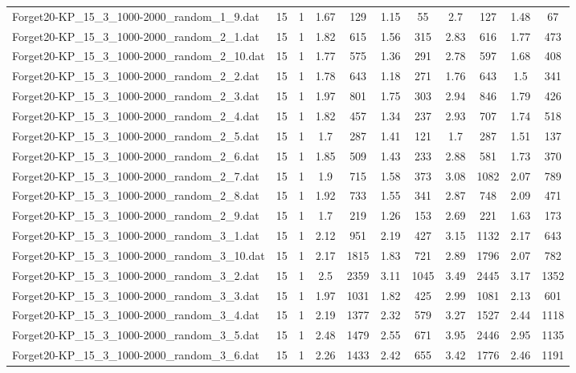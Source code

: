 \begin{table}[!ht]
\begin{tabular}{lcccccccccc}
Forget20-KP\_15\_3\_1000-2000\_random\_1\_9.dat & 15 & 1 & 1.67 & 129 & 1.15 & 55 & 2.7 & 127 & 1.48 & 67 \\
Forget20-KP\_15\_3\_1000-2000\_random\_2\_1.dat & 15 & 1 & 1.82 & 615 & 1.56 & 315 & 2.83 & 616 & 1.77 & 473 \\
Forget20-KP\_15\_3\_1000-2000\_random\_2\_10.dat & 15 & 1 & 1.77 & 575 & 1.36 & 291 & 2.78 & 597 & 1.68 & 408 \\
Forget20-KP\_15\_3\_1000-2000\_random\_2\_2.dat & 15 & 1 & 1.78 & 643 & 1.18 & 271 & 1.76 & 643 & 1.5 & 341 \\
Forget20-KP\_15\_3\_1000-2000\_random\_2\_3.dat & 15 & 1 & 1.97 & 801 & 1.75 & 303 & 2.94 & 846 & 1.79 & 426 \\
Forget20-KP\_15\_3\_1000-2000\_random\_2\_4.dat & 15 & 1 & 1.82 & 457 & 1.34 & 237 & 2.93 & 707 & 1.74 & 518 \\
Forget20-KP\_15\_3\_1000-2000\_random\_2\_5.dat & 15 & 1 & 1.7 & 287 & 1.41 & 121 & 1.7 & 287 & 1.51 & 137 \\
Forget20-KP\_15\_3\_1000-2000\_random\_2\_6.dat & 15 & 1 & 1.85 & 509 & 1.43 & 233 & 2.88 & 581 & 1.73 & 370 \\
Forget20-KP\_15\_3\_1000-2000\_random\_2\_7.dat & 15 & 1 & 1.9 & 715 & 1.58 & 373 & 3.08 & 1082 & 2.07 & 789 \\
Forget20-KP\_15\_3\_1000-2000\_random\_2\_8.dat & 15 & 1 & 1.92 & 733 & 1.55 & 341 & 2.87 & 748 & 2.09 & 471 \\
Forget20-KP\_15\_3\_1000-2000\_random\_2\_9.dat & 15 & 1 & 1.7 & 219 & 1.26 & 153 & 2.69 & 221 & 1.63 & 173 \\
Forget20-KP\_15\_3\_1000-2000\_random\_3\_1.dat & 15 & 1 & 2.12 & 951 & 2.19 & 427 & 3.15 & 1132 & 2.17 & 643 \\
Forget20-KP\_15\_3\_1000-2000\_random\_3\_10.dat & 15 & 1 & 2.17 & 1815 & 1.83 & 721 & 2.89 & 1796 & 2.07 & 782 \\
Forget20-KP\_15\_3\_1000-2000\_random\_3\_2.dat & 15 & 1 & 2.5 & 2359 & 3.11 & 1045 & 3.49 & 2445 & 3.17 & 1352 \\
Forget20-KP\_15\_3\_1000-2000\_random\_3\_3.dat & 15 & 1 & 1.97 & 1031 & 1.82 & 425 & 2.99 & 1081 & 2.13 & 601 \\
Forget20-KP\_15\_3\_1000-2000\_random\_3\_4.dat & 15 & 1 & 2.19 & 1377 & 2.32 & 579 & 3.27 & 1527 & 2.44 & 1118 \\
Forget20-KP\_15\_3\_1000-2000\_random\_3\_5.dat & 15 & 1 & 2.48 & 1479 & 2.55 & 671 & 3.95 & 2446 & 2.95 & 1135 \\
Forget20-KP\_15\_3\_1000-2000\_random\_3\_6.dat & 15 & 1 & 2.26 & 1433 & 2.42 & 655 & 3.42 & 1776 & 2.46 & 1191 \\

\end{tabular}
\end{table}
